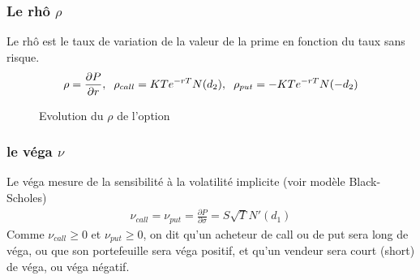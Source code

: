 \documentclass[a4paper]{article}
\begin{document}
\subsubsection{Le rhô $\rho$}
Le rhô est le taux de variation de la valeur de la prime en fonction du taux sans risque.
\begin{align*}
    \rho = \frac{\partial P}{\partial r}, \hspace{2mm} \rho_{call} =  K T e^{- r T} N(d_2),  \hspace{2mm} \rho_{put} = - K T e^{- r T} N(- d_2)
\end{align*}

\begin{figure}[H]
\caption{Evolution du $\rho$ de l'option}
\end{figure} 

\subsubsection{le véga $\nu$}
Le véga mesure de la sensibilité à la volatilité implicite (voir modèle Black-Scholes)
\begin{align*}
    \nu_{call} = \nu_{put} = \frac{\partial P}{\partial \sigma} = S\sqrt{T} N'(d_1)
\end{align*}
Comme $\nu_{call}\geq 0$ et $\nu_{put}\geq 0$, on dit qu'un acheteur de call ou de put sera long de véga, ou que son portefeuille sera véga positif, et qu'un vendeur sera court (short) de véga, ou véga négatif. 
\end{document}
